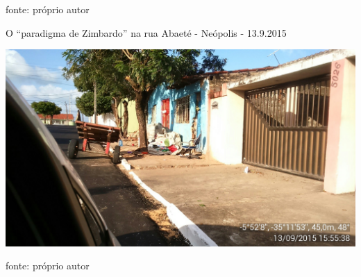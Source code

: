 \documentclass[
	12pt,				%
	openright,			%
	twoside,			%
	a4paper,			%
	chapter=TITLE,		%
	section=TITLE,		%
	subsection=TITLE,	%
	subsubsection=TITLE,%
	spanish,            %
	english,			%
	brazil				%
	]{abntex2}
\begin{document}
\begin{anexosenv}
\begin{foto}[!htpb]
\begin{center}
	\end{center}
	\ABNTEXchapterfont\small{fonte: próprio autor}
\end{foto}
\begin{foto}[!htpb]
	\caption{\label{FotoF}O “paradigma de Zimbardo” na rua Abaeté - Neópolis - 13.9.2015}
	\begin{center}
		\includegraphics[scale=0.23]{abaete5.jpg}
	\end{center}
	\ABNTEXchapterfont\small{fonte: próprio autor}
\end{foto}


\end{anexosenv}
\end{document}

